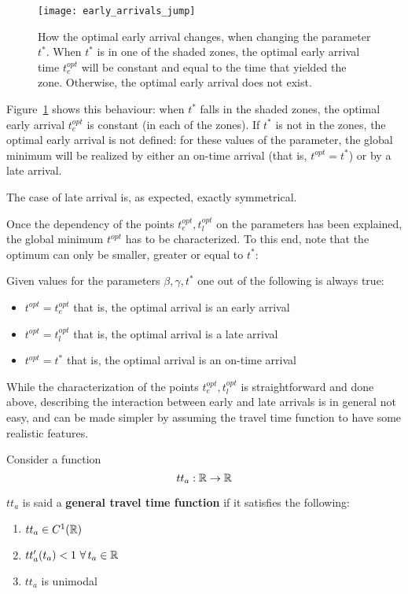\begin{figure}
  \centering
  \texttt{[image: early\_arrivals\_jump]}
  \caption{How the optimal early arrival changes,
    when changing the parameter \(t^*\).
    When \(t^*\) is in one of the shaded zones,
    the optimal early arrival time \(t_e^{opt}\) will be constant and equal to the time that yielded the zone.
  Otherwise, the optimal early arrival does not exist.}
  \label{fig:early_arrivals_jump}
\end{figure}

Figure~\ref{fig:early_arrivals_jump} shows this behaviour:
when \(t^*\) falls in the shaded zones,
the optimal early arrival \(t_e^{opt}\) is constant (in each of the zones).
If \(t^*\) is not in the zones,
the optimal early arrival is not defined:
for these values of the parameter,
the global minimum will be realized by either an on-time arrival (that is, \(t^{opt} = t^*\))
or by a late arrival.

The case of late arrival is, as expected, exactly symmetrical.

Once the dependency of the points \(t_e^{opt}, t_l^{opt}\) on the parameters has been explained,
the global minimum \(t^{opt}\) has to be characterized.
To this end, note that the optimum can only be smaller, greater or equal to \(t^*\):
\begin{obs}
  \label{obs:t_opt-dep}
  Given values for the parameters \(\beta, \gamma, t^*\) one out of the following is always true:
  \begin{itemize}
  \item \(t^{opt} = t_e^{opt}\) that is, the optimal arrival is an early arrival
  \item \(t^{opt} = t_l^{opt}\) that is, the optimal arrival is a late arrival
  \item \(t^{opt} = t^*\) that is, the optimal arrival is an on-time arrival
  \end{itemize}
\end{obs}

While the characterization of the points \(t_e^{opt}, t_l^{opt}\) is straightforward and done above,
describing the interaction between early and late arrivals is in general not easy,
and can be made simpler by assuming the travel time function to have some realistic features.

\begin{definition}
  \label{def:gen-tt-fun}
  Consider a function
  \begin{equation*}
    tt_a: \mathbb{R} \rightarrow \mathbb{R}
  \end{equation*}

  \(tt_a\) is said a \textbf{general travel time function} if it satisfies the following:
  \begin{enumerate}
  \item \(tt_a \in C^1(\mathbb{R})\)
  \item \(tt_a'(t_a) < 1\ \forall\, t_a\in \mathbb{R}\)
  \item \(tt_a\) is unimodal
  \end{enumerate}
\end{definition}

